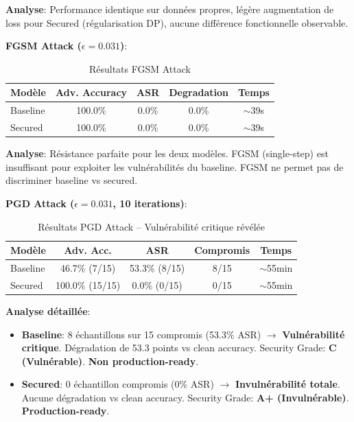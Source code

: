 \textbf{Analyse}: Performance identique sur données propres, légère augmentation de loss pour Secured (régularisation DP), aucune différence fonctionnelle observable.

\vspace{0.5cm}

\textbf{FGSM Attack ($\epsilon=0.031$)}:

\begin{table}[h]
\centering
\caption{Résultats FGSM Attack}
\label{tab:fgsm_attack}
\begin{tabular}{lcccc}
\hline
\textbf{Modèle} & \textbf{Adv. Accuracy} & \textbf{ASR} & \textbf{Degradation} & \textbf{Temps} \\
\hline
Baseline & 100.0\% & 0.0\% & 0.0\% & $\sim$39s \\
Secured & 100.0\% & 0.0\% & 0.0\% & $\sim$39s \\
\hline
\end{tabular}
\end{table}

\textbf{Analyse}: Résistance parfaite pour les deux modèles. FGSM (single-step) est insuffisant pour exploiter les vulnérabilités du baseline. FGSM ne permet pas de discriminer baseline vs secured.

\vspace{0.5cm}

\textbf{PGD Attack ($\epsilon=0.031$, 10 iterations)}:

\begin{table}[h]
\centering
\caption{Résultats PGD Attack -- Vulnérabilité critique révélée}
\label{tab:pgd_attack}
\begin{tabular}{lcccc}
\hline
\textbf{Modèle} & \textbf{Adv. Acc.} & \textbf{ASR} & \textbf{Compromis} & \textbf{Temps} \\
\hline
Baseline & 46.7\% (7/15) & 53.3\% (8/15) & 8/15 & $\sim$55min \\
Secured & 100.0\% (15/15) & 0.0\% (0/15) & 0/15 & $\sim$55min \\
\hline
\end{tabular}
\end{table}

\textbf{Analyse détaillée}:

\begin{itemize}
    \item \textbf{Baseline}: 8 échantillons sur 15 compromis (53.3\% ASR) $\rightarrow$ \textbf{Vulnérabilité critique}. Dégradation de 53.3 points vs clean accuracy. Security Grade: \textbf{C (Vulnérable)}. \textbf{Non production-ready}.

    \item \textbf{Secured}: 0 échantillon compromis (0\% ASR) $\rightarrow$ \textbf{Invulnérabilité totale}. Aucune dégradation vs clean accuracy. Security Grade: \textbf{A+ (Invulnérable)}. \textbf{Production-ready}.
\end{itemize}

